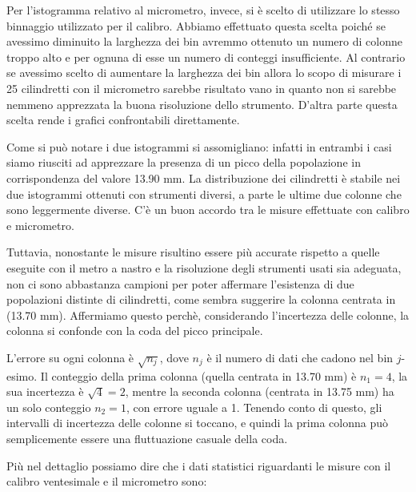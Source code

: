 Per l'istogramma relativo al micrometro, invece, si è scelto di utilizzare lo stesso
binnaggio utilizzato per il calibro. Abbiamo effettuato questa scelta poiché se avessimo
diminuito la larghezza dei bin avremmo ottenuto un numero di colonne troppo alto e per
ognuna di esse un numero di conteggi insufficiente. Al contrario se avessimo scelto
di aumentare la larghezza dei bin allora lo scopo di misurare i 25 cilindretti
con il micrometro sarebbe risultato vano in quanto non si sarebbe nemmeno apprezzata
la buona risoluzione dello strumento. D'altra parte questa scelta rende i grafici 
confrontabili direttamente.

Come si può notare i due istogrammi si assomigliano: infatti in entrambi i casi
siamo riusciti ad apprezzare la presenza di un picco della popolazione in
corrispondenza del valore 13.90 mm. La distribuzione dei cilindretti è stabile
nei due istogrammi ottenuti con strumenti diversi, a parte le ultime due colonne
che sono leggermente diverse. C'è un buon accordo tra le misure effettuate con
calibro e micrometro.

Tuttavia, nonostante le misure risultino essere
più accurate rispetto a quelle eseguite con il metro a nastro e la risoluzione
degli strumenti usati sia adeguata, non ci sono abbastanza campioni per poter affermare
l'esistenza di due popolazioni distinte di cilindretti, come sembra suggerire la colonna
centrata in (13.70 mm). Affermiamo questo perchè, considerando l'incertezza delle colonne,
la colonna si confonde con la coda del picco principale.

L'errore su ogni colonna è $\sqrt{n_j}$, dove $n_j$ è il numero di dati che cadono nel
bin $j$-esimo. Il conteggio della prima colonna (quella centrata in 13.70 mm) è $n_1 = 4$,
la sua incertezza è $\sqrt{4} = 2$, mentre la seconda colonna (centrata in 13.75 mm) ha un
solo conteggio $n_2 = 1$, con errore uguale a 1. Tenendo conto di questo, gli intervalli
di incertezza delle colonne si toccano, e quindi la prima colonna può semplicemente essere
una fluttuazione casuale della coda.

Più nel dettaglio possiamo dire che i dati statistici riguardanti le misure con il calibro
ventesimale e il micrometro sono:

